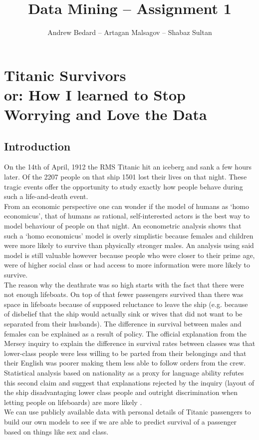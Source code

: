 \documentclass[english, a4paper]{article}
\title{Data Mining -- Assignment 1}
\author{Andrew Bedard -- Artagan Malsagov -- Shabaz Sultan}
\begin{document}
\maketitle
\section{Titanic Survivors\\ \large or: How I learned to Stop Worrying and Love the Data}
\subsection{Introduction}
On the 14th of April, 1912 the RMS Titanic hit an iceberg and sank a few hours later. Of the 2207 people on that ship 1501 lost their lives on that night. These tragic events offer the opportunity to study exactly how people behave during such a life-and-death event.\\
From an economic perspective one can wonder if the model of humans as `homo economicus', that of humans as rational, self-interested actors is the best way to model behaviour of people on that night. An econometric analysis shows that such a `homo economicus' model is overly simplistic because females and children were more likely to survive than physically stronger males. An analysis using said model is still valuable however because people who were closer to their prime age, were of higher social class or had access to more information were more likely to survive\cite{Frey2010}\cite{Frey2011}. \\
The reason why the deathrate was so high starts with the fact that there were not enough lifeboats. On top of that fewer passengers survived than there was space in lifeboats because of supposed reluctance to leave the ship (e.g. because of disbelief that the ship would actually sink or wives that did not want to be separated from their husbands). The difference in survival between males and females can be explained as a result of policy. The official explanation from the Mersey inquiry to explain the difference in survival rates between classes was that lower-class people were less willing to be parted from their belongings and that their English was poorer making them less able to follow orders from the crew. Statistical analysis based on nationality as a proxy for language ability refutes this second claim and suggest that explanations rejected by the inquiry (layout of the ship disadvantaging lower class people and outright discrimination when letting people on lifeboards) are more likely \cite{Hall1986}.\\
We can use publicly available data with personal details of Titanic passengers to build our own models to see if we are able to predict survival of a passenger based on things like sex and class.
\end{document}
